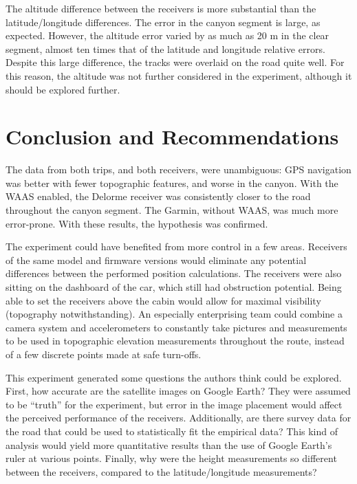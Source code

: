 \documentclass[]{aiaa-tc}%
\begin{document}
	\vspace{5 mm}
	
	\noindent The altitude difference between the receivers is more substantial than the latitude/longitude differences.  The error in the canyon segment is large, as expected. However, the altitude error varied by as much as 20 m in the clear segment, almost ten times that of the latitude and longitude relative errors.  Despite this large difference, the tracks were overlaid on the road quite well.  For this reason, the altitude was not further considered in the experiment, although it should be explored further.

	\section{Conclusion and Recommendations}
	
	\noindent The data from both trips, and both receivers, were unambiguous: GPS navigation was better with fewer topographic features, and worse in the canyon. With the WAAS enabled, the Delorme receiver was consistently closer to the road throughout the canyon segment. The Garmin, without WAAS, was much more error-prone. With these results, the hypothesis was confirmed. 
	
	\vspace{5 mm}
	
	\noindent The experiment could have benefited from more control in a few areas. Receivers of the same model and firmware versions would eliminate any potential differences between the performed position calculations. The receivers were also sitting on the dashboard of the car, which still had obstruction potential. Being able to set the receivers above the cabin would allow for maximal visibility (topography notwithstanding). An especially enterprising team could combine a camera system and accelerometers to constantly take pictures and measurements to be used in topographic elevation measurements throughout the route, instead of a few discrete points made at safe turn-offs.
	
	\vspace{5 mm}
	
	\noindent This experiment generated some questions the authors think could be explored. First, how accurate are the satellite images on Google Earth? They were assumed to be “truth” for the experiment, but error in the image placement would affect the perceived performance of the receivers. Additionally, are there survey data for the road that could be used to statistically fit the empirical data? This kind of analysis would yield more quantitative results than the use of Google Earth's ruler at various points. Finally, why were the height measurements so different between the receivers, compared to the latitude/longitude measurements?
	
\end{document}
